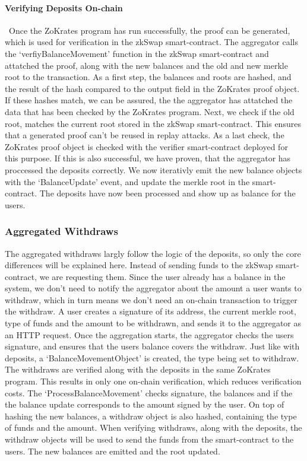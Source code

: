 \documentclass[../../thesis.tex]{subfiles}
\begin{document}
\paragraph{Verifying Deposits On-chain} \
Once the ZoKrates program has run successfully, the proof can be generated, which is used for verification in the zkSwap smart-contract. The aggregator calls the `verfiyBalanceMovement' function in the zkSwap smart-contract and attatched the proof, along with the new balances and the old and new merkle root to the transaction. As a first step, the balances and roots are hashed, and the result of the hash compared to the output field in the ZoKrates proof object. If these hashes match, we can be assured, the the aggregator has attatched the data that has been checked by the ZoKrates program. Next, we check if the old root, matches the current root stored in the zkSwap smart-contract. This ensures that a generated proof can't be reused in replay attacks. As a last check, the ZoKrates proof object is checked with the verifier smart-contract deployed for this purpose. If this is also successful, we have proven, that the aggregator has proccessed the deposits correctly. We now iterativly emit the new balance objects with the `BalanceUpdate' event, and update the merkle root in the smart-contract. The deposits have now been processed and show up as balance for the users. 

\subsubsection{Aggregated Withdraws} \label{with}
The aggregated withdraws largly follow the logic of the deposits, so only the core differences will be explained here. Instead of sending funds to the zkSwap smart-contract, we are requesting them. Since the user already has a balance in the system, we don't need to notify the aggregator about the amount a user wants to withdraw, which in turn means we don't need an on-chain transaction to trigger the withdraw. A user creates a signature of its address, the current merkle root, type of funds and the amount to be withdrawn, and sends it to the aggregator as an HTTP request. Once the aggregation starts, the aggregator checks the users signature, and ensures that the users balance covers the withdraw. Just like with deposits, a `BalanceMovementObject' is created, the type being set to withdraw. The withdraws are verified along with the deposits in the same ZoKrates program. This results in only one on-chain verification, which reduces verification costs. The `ProcessBalanceMovement' checks signature, the balances and if the the balance update corresponds to the amount signed by the user. On top of hashing the new balances, a withdraw object is also hashed, containing the type of funds and the amount. When verifying withdraws, along with the deposits, the withdraw objects will be used to send the funds from the smart-contract to the users. The new balances are emitted and the root updated. 
\end{document}
